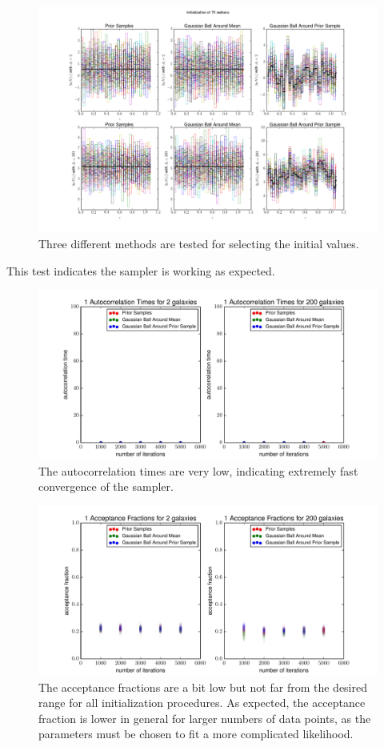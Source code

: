\documentclass[12pt, onecolumn]{emulateapj}
\begin{document}
\begin{figure}
\label{fig:fakeival}
\includegraphics[scale=0.25]{initializations.png}
\caption{Three different methods are tested for selecting the initial values.}
\end{figure}

This test indicates the sampler is working as expected.

\begin{figure}
\label{fig:dumbestacor}
\includegraphics[scale=0.25]{acorr.pdf}
\caption{The autocorrelation times are very low, indicating extremely fast convergence of the sampler.}
\end{figure}

\begin{figure}
\label{fig:dumbestfrac}
\includegraphics[scale=0.25]{fracs.pdf}
\caption{The acceptance fractions are a bit low but not far from the desired range for all initialization procedures.  As expected, the acceptance fraction is lower in general for larger numbers of data points, as the parameters must be chosen to fit a more complicated likelihood.}
\end{figure}
\end{document}
